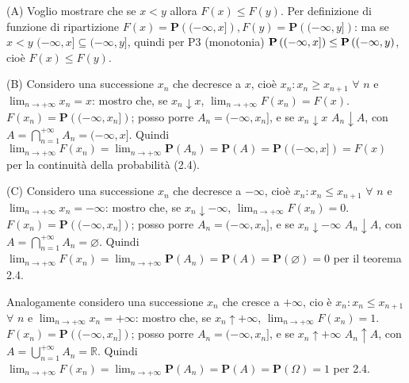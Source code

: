 \documentclass{article}
\begin{document}
(A) Voglio mostrare che se $x<y$ allora $F\left( x\right) \leq F\left(
y\right) $. Per definizione di funzione di ripartizione $F\left( x\right) =%
\mathbf{P}\left( (-\infty ,x]\right) ,F\left( y\right) =\mathbf{P}\left(
(-\infty ,y]\right) $: ma se $x<y$ $(-\infty ,x]\subseteq (-\infty ,y]$,
quindi per P3 (monotonia) $\mathbf{P}\left( (-\infty ,x]\right) \leq \mathbf{%
P}\left( (-\infty ,y\right) $, cio\`{e} $F\left( x\right) \leq F\left(
y\right) $.

(B) Considero una successione $x_{n}$ che decresce a $x$, cio\`{e} $%
x_{n}:x_{n}\geq x_{n+1}$ $\forall $ $n$ e $\lim_{n\rightarrow +\infty
}x_{n}=x$: mostro che, se $x_{n}\downarrow x$, $\lim_{n\rightarrow +\infty
}F\left( x_{n}\right) =F\left( x\right) $. $F\left( x_{n}\right) =\mathbf{P}\left(
(-\infty ,x_{n}]\right) $; posso porre $A_{n}=(-\infty ,x_{n}]$, e se $%
x_{n}\downarrow x$ $A_{n}\downarrow A$, con $A=\bigcap_{n=1}^{+\infty
}A_{n}=(-\infty ,x]$. Quindi $\lim_{n\rightarrow +\infty }F\left(
x_{n}\right) =\lim_{n\rightarrow +\infty }\mathbf{P}\left( A_{n}\right) =%
\mathbf{P}\left( A\right) =\mathbf{P}\left( (-\infty ,x]\right) =F\left(
x\right) $ per la continuit\`{a} della probabilit\`{a} (2.4).

(C) Considero una successione $x_{n}$ che decresce a $-\infty $, cio\`{e} $%
x_{n}:x_{n}\leq x_{n+1}$ $\forall $ $n$ e $\lim_{n\rightarrow +\infty
}x_{n}=-\infty $: mostro che, se $x_{n}\downarrow -\infty $, $%
\lim_{n\rightarrow +\infty }F\left( x_{n}\right) =0$. $F\left( x_{n}\right) =%
\mathbf{P}\left( (-\infty ,x_{n}]\right) $; posso porre $A_{n}=(-\infty
,x_{n}]$, e se $x_{n}\downarrow -\infty $ $A_{n}\downarrow A$, con $%
A=\bigcap_{n=1}^{+\infty }A_{n}=\varnothing $. Quindi $\lim_{n\rightarrow
+\infty }F\left( x_{n}\right) =\lim_{n\rightarrow +\infty }\mathbf{P}\left(
A_{n}\right) =\mathbf{P}\left( A\right) =\mathbf{P}\left( \varnothing
\right) =0$ per il teorema 2.4.

Analogamente considero una successione $x_{n}$ che cresce a $+\infty $, cio%
\`{e} $x_{n}:x_{n}\leq x_{n+1}$ $\forall $ $n$ e $\lim_{n\rightarrow +\infty
}x_{n}=+\infty $: mostro che, se $x_{n}\uparrow +\infty $, $%
\lim_{n\rightarrow +\infty }F\left( x_{n}\right) =1$. $F\left( x_{n}\right) =%
\mathbf{P}\left( (-\infty ,x_{n}]\right) $; posso porre $A_{n}=(-\infty
,x_{n}]$, e se $x_{n}\uparrow +\infty $ $A_{n}\uparrow A$, con $%
A=\bigcup_{n=1}^{+\infty }A_{n}=%
\mathbb{R}
$. Quindi $\lim_{n\rightarrow +\infty }F\left( x_{n}\right)
=\lim_{n\rightarrow +\infty }\mathbf{P}\left( A_{n}\right) =\mathbf{P}\left(
A\right) =\mathbf{P}\left( \Omega \right) =1$ per 2.4.
\end{document}
